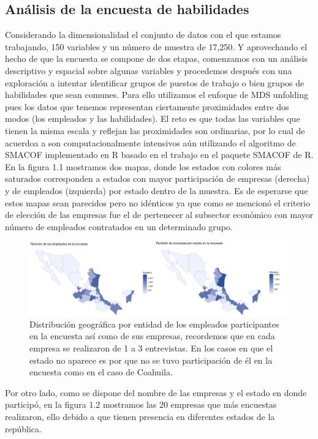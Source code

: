 \documentclass[paper=letter, fontsize=11pt]{scrartcl}
\numberwithin{equation}{section} %
\numberwithin{figure}{section} %
\numberwithin{table}{section} %
\begin{document}
\subsection{Análisis de la encuesta de habilidades}
Considerando la dimensionalidad el conjunto de datos con el que estamos trabajando, 150 variables y un número de muestra de 17,250. Y aprovechando el hecho de que la encuesta se compone de dos etapas, comenzamos con un análisis descriptivo y espacial sobre algunas variables y procedemos después con una exploración a intentar identificar grupos de puestos de trabajo o bien grupos de habilidades que sean comunes. Para ello utilizamos el enfoque de MDS unfolding pues los datos que tenemos representan ciertamente proximidades entre dos modos (los empleados y las habilidades). El reto es que todas las variables que tienen la misma escala y reflejan las proximidades son ordinarias, por lo cual de acuerdoa a \cite{roris} son computacionalmente intensivos aún utilizando el algoritmo de SMACOF implementado en R\cite{R} basado en el trabajo \cite{smacof} en el paquete SMACOF de R\cite{Rsmacof}.\\

En la figura 1.1 mostramos dos mapas, donde los estados con colores más saturados corresponden a estados con mayor participación de empresas (derecha) y de empleados (izquierda) por estado dentro de la muestra. Es de esperarse que estos mapas sean parecidos pero no idénticos ya que como se mencionó el criterio de elección de las empresas fue el de pertenecer al subsector económico con mayor número de empleados contratados en un determinado grupo. 
\begin{figure}[H]
  \begin{center}
    \includegraphics[scale=.4]{mapas.png}
    \caption{Distribución geográfica por entidad de los empleados participantes en la encuesta así como de sus empresas, recordemos que en cada empresa se realizaron de 1 a 3 entrevistas. En los casos en que el estado no aparece es por que no se tuvo participación de él en la encuesta como en el caso de Coahuila.}
    \label{figura1_1}
  \end{center}
\end{figure}
Por otro lado, como se dispone del nombre de las empresas y el estado en donde participó, en la figura 1.2 mostramos las 20 empresas que más encuestas realizaron, ello debido a que tienen presencia en diferentes estados de la república. 
\end{document}
